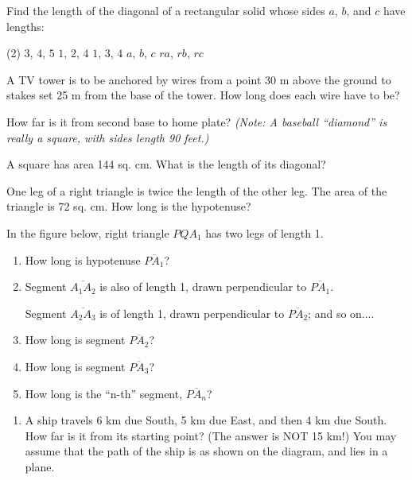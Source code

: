 \documentclass[12pt]{book} %
\begin{document}
\setcounter{Exercise}{4}
\begin{ExerciseList}
\Exercise Find the length of the diagonal of a rectangular solid whose sides $a$, $b$, and $c$ have lengths:
\begin{tasks}(2)
\task[(a)] $3$, $4$, $5$
\task[(b)] $1$, $2$, $4$
\task[(c)] $1$, $3$, $4$
\task[(d)] $a$, $b$, $c$
\task[(e)] $ra$, $rb$, $rc$
\end{tasks}


\Exercise A TV tower is to be anchored by wires from a point 30 m above the ground to stakes set 25 m from the base of the tower. How long does each wire have to be?


\Exercise How far is it from second base to home plate? \textit{(Note: A baseball ``diamond'' is really a square, with sides length 90 feet.)}

\Exercise A square has area 144 sq. cm. What is the length of its diagonal?

\Exercise One leg of a right triangle is twice the length of the other leg. The area of the triangle is 72 sq. cm. How long is the hypotenuse?

\Exercise In the figure below, right triangle $PQA_1$ has two legs of length 1.
\begin{enumerate}
\item[(a)] How long is hypotenuse $\overline{PA_1}$?

\item Segment $\overline{A_1A_2}$ is also of length 1, drawn perpendicular to $\overline{PA_1}$.

Segment $\overline{A_2A_3}$ is of length 1, drawn perpendicular to $\overline{PA_2}$; and so on....

\item[(b)] How long is segment $\overline{PA_2}$?
\item[(c)] How long is segment $\overline{PA_3}$?
\item[(d)] How long is the ``n-th'' segment, $\overline{PA_n}$?
\end{enumerate}


\Exercise
\begin{enumerate}
\item[(a)] A ship travels 6 km due South, 5 km due East, and then 4 km due South. How far is it from its starting point? (The answer is NOT 15 km!) You may assume that the path of the ship is as shown on the diagram, and lies in a plane.


\end{enumerate}
\end{ExerciseList}
\end{document}
